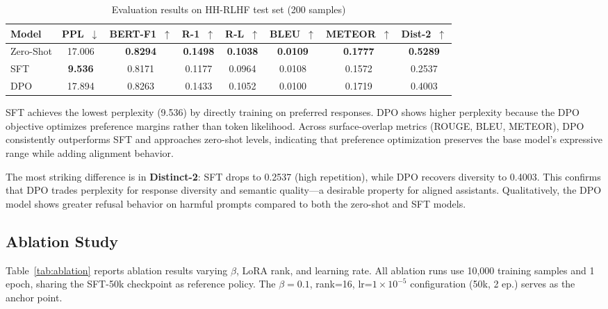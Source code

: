 \documentclass{llncs}
\begin{document}
\begin{table}[t]
\centering
\caption{Evaluation results on HH-RLHF test set (200 samples)}
\label{tab:results}
\begin{tabular}{lccccccc}
\toprule
\textbf{Model} & \textbf{PPL}~$\downarrow$ & \textbf{BERT-F1}~$\uparrow$ & \textbf{R-1}~$\uparrow$ & \textbf{R-L}~$\uparrow$ & \textbf{BLEU}~$\uparrow$ & \textbf{METEOR}~$\uparrow$ & \textbf{Dist-2}~$\uparrow$ \\
\midrule
Zero-Shot & 17.006 & \textbf{0.8294} & \textbf{0.1498} & \textbf{0.1038} & \textbf{0.0109} & \textbf{0.1777} & \textbf{0.5289} \\
SFT       & \textbf{9.536}  & 0.8171 & 0.1177 & 0.0964 & 0.0108 & 0.1572 & 0.2537 \\
DPO       & 17.894 & 0.8263 & 0.1433 & 0.1052 & 0.0100 & 0.1719 & 0.4003 \\
\bottomrule
\end{tabular}
\end{table}

SFT achieves the lowest perplexity (9.536) by directly training on preferred responses.
DPO shows higher perplexity because the DPO objective optimizes preference margins
rather than token likelihood. Across surface-overlap metrics (ROUGE, BLEU, METEOR),
DPO consistently outperforms SFT and approaches zero-shot levels, indicating that
preference optimization preserves the base model's expressive range while adding
alignment behavior.

The most striking difference is in \textbf{Distinct-2}: SFT drops to 0.2537 (high
repetition), while DPO recovers diversity to 0.4003. This confirms that DPO trades
perplexity for response diversity and semantic quality---a desirable property for
aligned assistants. Qualitatively, the DPO model shows greater refusal behavior on
harmful prompts compared to both the zero-shot and SFT models.

\subsection{Ablation Study}

Table~\ref{tab:ablation} reports ablation results varying $\beta$, LoRA rank, and
learning rate. All ablation runs use 10,000 training samples and 1 epoch, sharing
the SFT-50k checkpoint as reference policy. The $\beta=0.1$, rank=16,
lr=$1\times10^{-5}$ configuration (50k, 2 ep.) serves as the anchor point.
\end{document}
